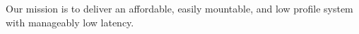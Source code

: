 Our mission is to deliver an affordable, easily mountable, and low profile system with manageably low latency.